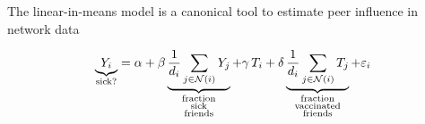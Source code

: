 \documentclass[final]{beamer}
\newlength{\colwidth}
\begin{document}
\begin{frame}[t]
\begin{columns}[t]
\begin{column}{\colwidth}
\begin{block}{The linear-in-means model is a canonical tool to estimate peer influence in network data}

                \begin{equation*}
                    \underbrace{Y_i}_\text{sick?} =
                    \alpha +
                    \beta \underbrace{\frac{1}{d_i}\sum_{j \in \mathcal N(i)} Y_j}_{\substack{\text{fraction} \\ \text{sick} \\ \text{friends}}} +
                    \gamma \, T_i +
                    \delta \underbrace{\frac{1}{d_i}\sum_{j \in \mathcal N(i)} T_j}_{\substack{\text{fraction} \\ \text{vaccinated} \\ \text{friends}}} +
                    \varepsilon_i
                \end{equation*}


\end{block}
\end{column}
\end{columns}
\end{frame}
\end{document}

